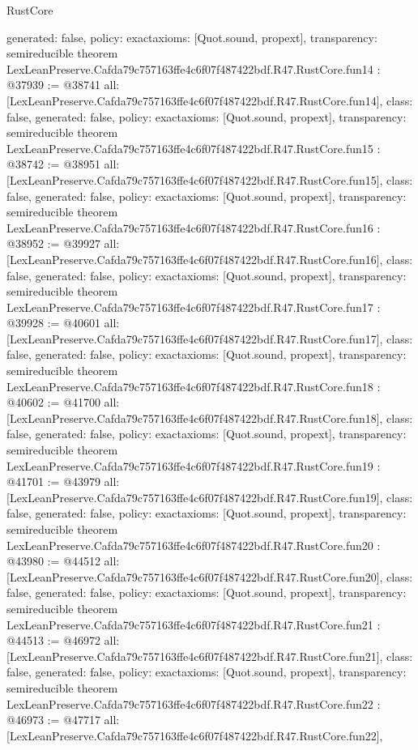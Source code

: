 \begin{lexlean}{RustCore}
\begin{coremodule}
{  generated: false,
  policy: exact{axioms: [Quot.sound, propext]},
  transparency: semireducible
}
theorem LexLeanPreserve.Cafda79c757163ffe4c6f07f487422bdf.R47.RustCore.fun14 : @37939 := @38741 {
  all: [LexLeanPreserve.Cafda79c757163ffe4c6f07f487422bdf.R47.RustCore.fun14],
  class: false,
  generated: false,
  policy: exact{axioms: [Quot.sound, propext]},
  transparency: semireducible
}
theorem LexLeanPreserve.Cafda79c757163ffe4c6f07f487422bdf.R47.RustCore.fun15 : @38742 := @38951 {
  all: [LexLeanPreserve.Cafda79c757163ffe4c6f07f487422bdf.R47.RustCore.fun15],
  class: false,
  generated: false,
  policy: exact{axioms: [Quot.sound, propext]},
  transparency: semireducible
}
theorem LexLeanPreserve.Cafda79c757163ffe4c6f07f487422bdf.R47.RustCore.fun16 : @38952 := @39927 {
  all: [LexLeanPreserve.Cafda79c757163ffe4c6f07f487422bdf.R47.RustCore.fun16],
  class: false,
  generated: false,
  policy: exact{axioms: [Quot.sound, propext]},
  transparency: semireducible
}
theorem LexLeanPreserve.Cafda79c757163ffe4c6f07f487422bdf.R47.RustCore.fun17 : @39928 := @40601 {
  all: [LexLeanPreserve.Cafda79c757163ffe4c6f07f487422bdf.R47.RustCore.fun17],
  class: false,
  generated: false,
  policy: exact{axioms: [Quot.sound, propext]},
  transparency: semireducible
}
theorem LexLeanPreserve.Cafda79c757163ffe4c6f07f487422bdf.R47.RustCore.fun18 : @40602 := @41700 {
  all: [LexLeanPreserve.Cafda79c757163ffe4c6f07f487422bdf.R47.RustCore.fun18],
  class: false,
  generated: false,
  policy: exact{axioms: [Quot.sound, propext]},
  transparency: semireducible
}
theorem LexLeanPreserve.Cafda79c757163ffe4c6f07f487422bdf.R47.RustCore.fun19 : @41701 := @43979 {
  all: [LexLeanPreserve.Cafda79c757163ffe4c6f07f487422bdf.R47.RustCore.fun19],
  class: false,
  generated: false,
  policy: exact{axioms: [Quot.sound, propext]},
  transparency: semireducible
}
theorem LexLeanPreserve.Cafda79c757163ffe4c6f07f487422bdf.R47.RustCore.fun20 : @43980 := @44512 {
  all: [LexLeanPreserve.Cafda79c757163ffe4c6f07f487422bdf.R47.RustCore.fun20],
  class: false,
  generated: false,
  policy: exact{axioms: [Quot.sound, propext]},
  transparency: semireducible
}
theorem LexLeanPreserve.Cafda79c757163ffe4c6f07f487422bdf.R47.RustCore.fun21 : @44513 := @46972 {
  all: [LexLeanPreserve.Cafda79c757163ffe4c6f07f487422bdf.R47.RustCore.fun21],
  class: false,
  generated: false,
  policy: exact{axioms: [Quot.sound, propext]},
  transparency: semireducible
}
theorem LexLeanPreserve.Cafda79c757163ffe4c6f07f487422bdf.R47.RustCore.fun22 : @46973 := @47717 {
  all: [LexLeanPreserve.Cafda79c757163ffe4c6f07f487422bdf.R47.RustCore.fun22],
}
\end{coremodule}
\end{lexlean}
